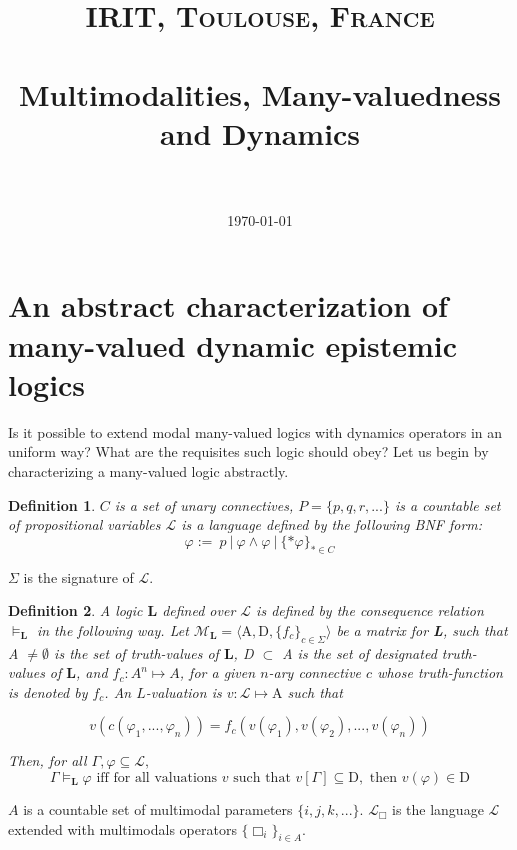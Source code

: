 \documentclass[paper=a4, fontsize=11pt]{scrartcl} %
\title{	
\normalfont \normalsize 
\textsc{IRIT, Toulouse, France} \\ [25pt] %
\horrule{0.5pt} \\[0.4cm] %
\huge Multimodalities, Many-valuedness and Dynamics
\\ %
\horrule{2pt} \\[0.5cm] %
}
\date{\normalsize\today} %
\numberwithin{equation}{section} %
\numberwithin{figure}{section} %
\numberwithin{table}{section} %
\begin{document}
\maketitle %

\section{An abstract characterization of many-valued dynamic epistemic logics}
\newtheorem{definition}{Definition}
\newtheorem{theorem}{Theorem}
\newtheorem{remark}{Remark}
Is it possible to extend modal many-valued logics with dynamics operators in an uniform way? What are the requisites such logic should obey? Let us begin by characterizing a many-valued logic abstractly.


\begin{definition}
    $C$ is a set of unary connectives, $P = \{p, q, r, ...\}$ is a countable set of propositional variables $\mathcal{L}$ is a language defined by the following BNF form:
    \[\varphi :=\ p\ |\ \varphi \land \varphi\ |\ \{*\varphi\}_{* \in C}
    \]
\end{definition}

    $\Sigma$ is the signature of $\mathcal{L}$. 
    
    \begin{definition} A logic $\textbf{L}$ defined over $\mathcal{L}$ is defined by the consequence relation $\vDash_{\textbf{L}}$ in the following way. Let $\mathcal{M}_{\textbf{L}} = \langle\mathrm{A}, \mathrm{D}, \{f_c\}_{c \in \Sigma}\rangle$ be a matrix for \textbf{L}, such that A $\neq \emptyset$ is the set of truth-values of $\textbf{L}$, D $\subset$ A is the set of \textit{designated} truth-values of $\textbf{L}$, and $f_c:A^n\mapsto A$, for a given $n$-ary connective $c$ whose truth-function is denoted by $f_c$. An $L$-valuation is $v: \mathcal{L} \mapsto \mathrm{A}$ such that 

    \[
    v(c(\varphi_1, ..., \varphi_n)) = f_c(v(\varphi_1), v(\varphi_2), ..., v(\varphi_n))
    \]

    Then, for all $\Gamma, \varphi \subseteq \mathcal{L},$
    \[\Gamma \vDash_{\textbf{L}} \varphi \text{ iff } \text{for all valuations } v \text{ such that } v[\Gamma] \subseteq \mathrm{D}, \text{ then } v(\varphi) \in \mathrm{D}\]
\end{definition}

 $A$ is a countable set of multimodal parameters $\{i, j, k, ...\}$. $\mathcal{L}_\Box$ is the language $\mathcal{L}$ extended with multimodals operators $\{\Box_i\}_{i \in A}$. 
\end{document}

